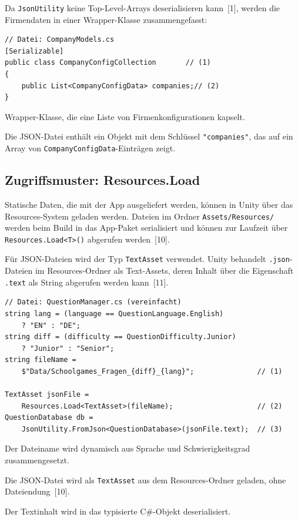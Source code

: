 \documentclass[12pt,a4paper]{article}
\begin{document}
Da \texttt{JsonUtility} keine Top-Level-Arrays deserialisieren kann~[1], werden die Firmendaten in einer Wrapper-Klasse zusammengefasst:

\begin{lstlisting}
// Datei: CompanyModels.cs
[Serializable]
public class CompanyConfigCollection       // (1)
{
    public List<CompanyConfigData> companies;// (2)
}
\end{lstlisting}

\begin{description}[leftmargin=2em, labelwidth=1.5em]
    \item[(1)] Wrapper-Klasse, die eine Liste von Firmenkonfigurationen kapselt.
    \item[(2)] Die JSON-Datei enthält ein Objekt mit dem Schlüssel \texttt{"companies"}, das auf ein Array von \texttt{CompanyConfigData}-Einträgen zeigt.
\end{description}

\subsection{Zugriffsmuster: Resources.Load}

Statische Daten, die mit der App ausgeliefert werden, können in Unity über das Resources-System geladen werden. Dateien im Ordner \texttt{Assets/Resources/} werden beim Build in das App-Paket serialisiert und können zur Laufzeit über \texttt{Resources.Load<T>()} abgerufen werden~[10].

Für JSON-Dateien wird der Typ \texttt{TextAsset} verwendet. Unity behandelt \texttt{.json}-Dateien im Resources-Ordner als Text-Assets, deren Inhalt über die Eigenschaft \texttt{.text} als String abgerufen werden kann~[11].

\begin{lstlisting}
// Datei: QuestionManager.cs (vereinfacht)
string lang = (language == QuestionLanguage.English)
    ? "EN" : "DE";
string diff = (difficulty == QuestionDifficulty.Junior)
    ? "Junior" : "Senior";
string fileName =
    $"Data/Schoolgames_Fragen_{diff}_{lang}";               // (1)

TextAsset jsonFile =
    Resources.Load<TextAsset>(fileName);                    // (2)
QuestionDatabase db =
    JsonUtility.FromJson<QuestionDatabase>(jsonFile.text);  // (3)
\end{lstlisting}

\begin{description}[leftmargin=2em, labelwidth=1.5em]
    \item[(1)] Der Dateiname wird dynamisch aus Sprache und Schwierigkeitsgrad zusammengesetzt.
    \item[(2)] Die JSON-Datei wird als \texttt{TextAsset} aus dem Resources-Ordner geladen, ohne Dateiendung~[10].
    \item[(3)] Der Textinhalt wird in das typisierte C\#-Objekt deserialisiert.
\end{description}
\end{document}
